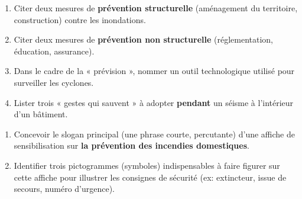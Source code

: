 \documentclass[11pt]{article}
\begin{document}
\begin{exercice}
\begin{enumerate}
    \item Citer deux mesures de \textbf{prévention structurelle} (aménagement du territoire, construction) contre les inondations.
    \item Citer deux mesures de \textbf{prévention non structurelle} (réglementation, éducation, assurance).
    \item Dans le cadre de la « prévision », nommer un outil technologique utilisé pour surveiller les cyclones.
    \item Lister trois « gestes qui sauvent » à adopter \textbf{pendant} un séisme à l'intérieur d'un bâtiment.
\end{enumerate}
\end{exercice}

\begin{exercice}
\begin{enumerate}
    \item Concevoir le slogan principal (une phrase courte, percutante) d'une affiche de sensibilisation sur \textbf{la prévention des incendies domestiques}.
    \item Identifier trois pictogrammes (symboles) indispensables à faire figurer sur cette affiche pour illustrer les consignes de sécurité (ex: extincteur, issue de secours, numéro d'urgence).
\end{enumerate}
\end{exercice}
\end{document}
